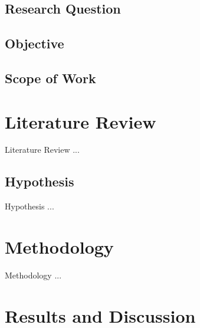 \documentclass[a4paper,12pt,oneside]{report}
\begin{document}
\section{Research Question}

\section{Objective}

\section{Scope of Work}



\chapter{Literature Review}
\label{ch2}
Literature Review ...

\section{Hypothesis}

Hypothesis ...


\chapter{Methodology}
\label{ch3}

Methodology ...



\chapter{Results and Discussion}
\label{ch4}
\end{document}
